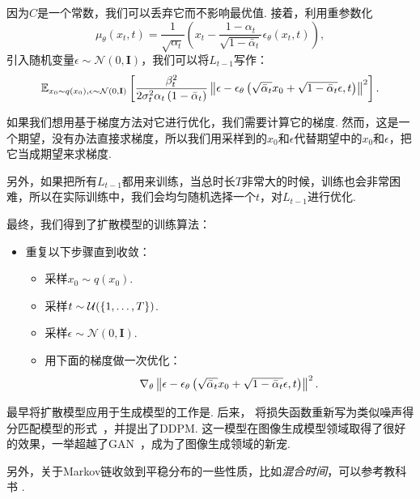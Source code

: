 因为$C$是一个常数，我们可以丢弃它而不影响最优值. 接着，利用重参数化
\[
\mu_{\theta}(x_t, t) =  \frac{1}{\sqrt{\alpha_t}} \left( x_t - \frac{1-\alpha_t}{\sqrt{1 - \bar{\alpha}_t}}\epsilon_{\theta}(x_t, t) \right),
\]
引入随机变量$\epsilon\sim\mathcal{N}(0,\mathbf{I})$，我们可以将$L_{t-1}$写作：
\[
\mathbb{E}_{x_0\sim q(x_0), \epsilon\sim\mathcal{N}(0,\mathbf{I})}\left[\frac{\beta_t^2}{2 \sigma_t^2 \alpha_t\left(1-\bar{\alpha}_t\right)}\left\|\epsilon-\epsilon_\theta\left(\sqrt{\bar{\alpha}_t} x_0+\sqrt{1-\bar{\alpha}_t} \epsilon, t\right)\right\|^2\right].
\]

如果我们想用基于梯度方法对它进行优化，我们需要计算它的梯度. 然而，这是一个期望，没有办法直接求梯度，所以我们用采样到的$x_0$和$\epsilon$代替期望中的$x_0$和$\epsilon$，把它当成期望来求梯度. 

另外，如果把所有$L_{t-1}$都用来训练，当总时长$T$非常大的时候，训练也会非常困难，所以在实际训练中，我们会均匀随机选择一个$t$，对$L_{t-1}$进行优化. 

最终，我们得到了扩散模型的训练算法：

\begin{itemize}
    \item 重复以下步骤直到收敛：
    \begin{itemize}
        \item 采样$x_0 \sim q\left(x_0\right)$.
        \item 采样$t \sim \mathcal{U}(\{1, \ldots, T\})$.
        \item 采样$\epsilon \sim \mathcal{N}(0, \mathbf{I})$.
        \item 用下面的梯度做一次优化：
        \[
        \nabla_\theta\left\|\epsilon-\epsilon_\theta\left(\sqrt{\bar{\alpha}_t} x_0+\sqrt{1-\bar{\alpha}_t} \epsilon, t\right)\right\|^2.
        \]
    \end{itemize}
\end{itemize}

\begin{remark}
    最早将扩散模型应用于生成模型的工作是\cite{sohl-dicksteinDeepUnsupervisedLearning2015}. 后来，\cite{hoDenoisingDiffusionProbabilistic2020} 将损失函数重新写为类似噪声得分匹配模型的形式~\cite{songGenerativeModelingEstimating2019}，并提出了DDPM. 这一模型在图像生成模型领域取得了很好的效果，一举超越了GAN~\cite{goodfellowGenerativeAdversarialNets2014}，成为了图像生成领域的新宠. 
    
    另外，关于Markov链收敛到平稳分布的一些性质，比如\textit{混合时间}，可以参考教科书 \cite{levinMarkovChainsMixing2008}.
\end{remark}

